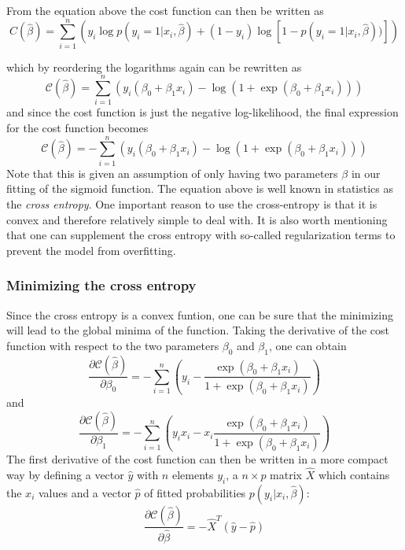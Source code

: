 \documentclass[a4paper,12pt]{article}
\begin{document}
 From the equation above the cost function can then be written as
 \begin{equation}
 C(\hat{\beta}) = \sum_{i=1}^n \left( y_i\log{p(y_i=1|x_i,\hat{\beta})} + (1-y_i)\log\left[1-p(y_i=1|x_i,\hat{\beta}))\right]\right)
 \end{equation}
 
 which by reordering the logarithms again can be rewritten as
 \begin{equation}
     \mathcal{C}(\hat{\beta}) = \sum_{i=1}^n  \left(y_i(\beta_0+\beta_1x_i) -\log{(1+\exp{(\beta_0+\beta_1x_i)})}\right)
 \end{equation}
 and since the cost function is just the negative log-likelihood, the final expression for the cost function becomes
 \begin{equation}
     \mathcal{C}(\hat{\beta}) = -\sum_{i=1}^n  \left(y_i(\beta_0+\beta_1x_i) -\log{(1+\exp{(\beta_0+\beta_1x_i)})}\right)
 \end{equation}
 Note that this is given an assumption of only having two parameters $\beta$ in our fitting of the sigmoid function.\newline
 The equation above is well known in statistics as the \emph{cross entropy}.\newline
 One important reason to use the cross-entropy is that it is convex and therefore relatively simple to deal with.
It is also worth mentioning that one can supplement the cross entropy with so-called regularization terms to prevent the model from overfitting.\newline

\subsubsection{Minimizing the cross entropy}
Since the cross entropy is a convex funtion, one can be sure that the minimizing will lead to the global minima of the function. Taking the derivative of the cost function with respect to the two parameters $\beta_0$ and $\beta_1$, one can obtain
\begin{equation*}
    \frac{\partial \mathcal{C}(\hat{\beta})}{\partial \beta_0} = -\sum_{i=1}^n  \left(y_i -\frac{\exp{(\beta_0+\beta_1x_i)}}{1+\exp{(\beta_0+\beta_1x_i)}}\right)
\end{equation*}
and
\begin{equation*}
    \frac{\partial \mathcal{C}(\hat{\beta})}{\partial \beta_1} = -\sum_{i=1}^n  \left(y_ix_i -x_i\frac{\exp{(\beta_0+\beta_1x_i)}}{1+\exp{(\beta_0+\beta_1x_i)}}\right)
\end{equation*}
The first derivative of the cost function can then be written in a more compact way by defining a vector $\hat{y}$ with $n$ elements $y_i$, a
$n\times p$ matrix $\hat{X}$ which contains the $x_i$ values and a
vector $\hat{p}$ of fitted probabilities $p(y_i\vert x_i,\hat{\beta})$:
\begin{equation}
    \frac{\partial \mathcal{C}(\hat{\beta})}{\partial \hat{\beta}} = -\hat{X}^T\left(\hat{y}-\hat{p}\right)
\end{equation}
\end{document}
